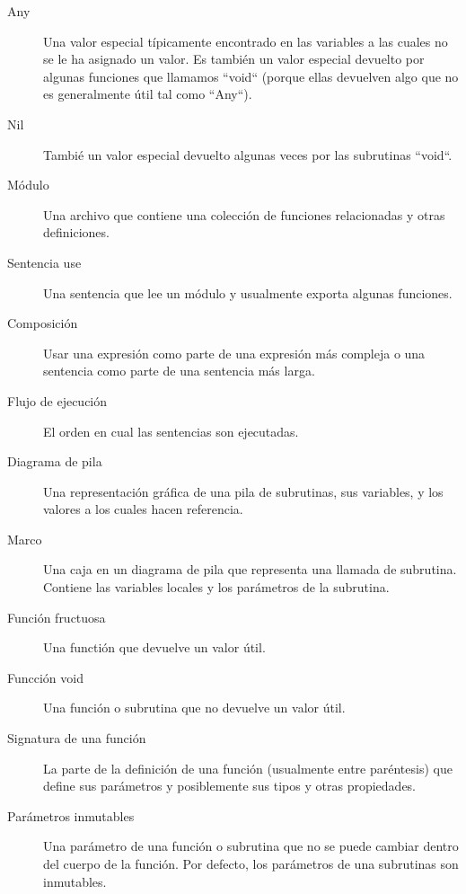 \begin{description}
\item[Any]  Una valor especial típicamente encontrado en 
las variables a las cuales no se le ha asignado un valor. Es 
también un valor especial devuelto por algunas funciones que 
llamamos ``void`` (porque ellas devuelven algo que no es
generalmente útil tal como ``Any``).

\item[Nil] Tambié un valor especial devuelto algunas veces
 por las subrutinas ``void``.

\item[Módulo] Una archivo que contiene una colección
de funciones relacionadas y otras definiciones.

\item[Sentencia use] Una sentencia que lee un módulo y 
usualmente exporta algunas funciones.

\item[Composición] Usar una expresión como parte de
una expresión más compleja o una sentencia como parte
de una sentencia más larga.

\item[Flujo de ejecución]  El orden en cual las sentencias
son ejecutadas.

\item[Diagrama de pila]  Una representación gráfica de una
pila de subrutinas, sus variables, y los valores a los cuales
hacen referencia.

\item[Marco]  Una caja en un diagrama de pila que representa una
llamada de subrutina. Contiene las variables locales y los 
parámetros de la subrutina.

\item[Función fructuosa] Una functión que devuelve un valor
útil.

\item[Funcción void] Una función o subrutina que no devuelve
un valor útil.

\item[Signatura de una función] La parte de la definición de 
una función (usualmente entre paréntesis) que define 
sus parámetros y posiblemente sus tipos y otras propiedades.

\item[Parámetros inmutables] Una parámetro de una función
o subrutina que no se puede cambiar dentro del cuerpo de
la función. Por defecto, los parámetros de una
subrutinas son inmutables.


\end{description}
